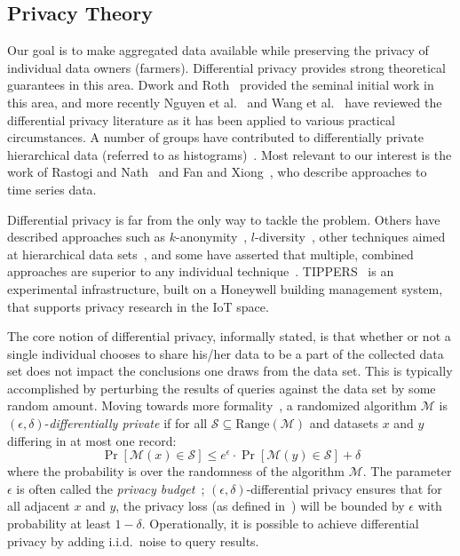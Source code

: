 \subsection{Privacy Theory}

Our goal is to make aggregated data available while preserving the
privacy of individual data owners (farmers).  Differential privacy
provides strong theoretical guarantees in this area.  Dwork and
Roth~\cite{dwork11,dr14} provided the seminal initial work in this
area, and more recently Nguyen et al.~\cite{nkk13} and
Wang et al.~\cite{wll15} have reviewed the differential
privacy literature as it has been applied to various practical circumstances.
A number of groups have contributed to differentially private hierarchical data
(referred to as histograms)~\cite{hrms10,xxy10}.
Most relevant to our interest is the work of
Rastogi and Nath~\cite{rn10} and
Fan and Xiong~\cite{fx12,fx14}, who describe approaches to time series data.

Differential privacy is far from the only way to tackle the problem.
Others have described approaches such as
$k$-anonymity~\cite{samarati01,sweeney02},
$l$-diversity~\cite{mkgv07},
other techniques aimed at hierarchical data sets~\cite{lnpr14}, and some
have asserted that multiple, combined approaches are superior to any
individual technique~\cite{ct13}.
TIPPERS~\cite{tippers} is an experimental infrastructure, built on a
Honeywell building management system, that supports privacy research
in the IoT space.

The core notion of differential privacy, informally stated, is that whether
or not a single individual chooses to share his/her data to be a part of
the collected data set does not impact the conclusions one draws from
the data set.
This is typically accomplished by perturbing the results of queries
against the data set by some random amount.
Moving towards more formality~\cite{dr14}, a randomized algorithm $\mathcal{M}$
is $(\epsilon,\delta)$-\emph{differentially private} if for all
$\mathcal{S} \subseteq \mbox{Range}(\mathcal{M})$ and datasets $x$ and $y$
differing in at most one record:
\begin{equation}
\Pr[\mathcal{M}(x) \in \mathcal{S}] \leq e^\epsilon \cdot \Pr[\mathcal{M}(y)
\in \mathcal{S}] + \delta
\label{eqn:dp}
\end{equation}
where the probability is over the randomness of the algorithm $\mathcal{M}$.
The parameter $\epsilon$ is often called the
\emph{privacy budget}~\cite{McSherry09}; $(\epsilon,\delta)$-differential
privacy ensures that for all adjacent $x$ and $y$, the privacy loss
(as defined in~\cite{dr14}) will
be bounded by $\epsilon$ with probability at least $1-\delta$.
Operationally, it is possible to achieve differential privacy by adding
i.i.d.~noise to query results.

